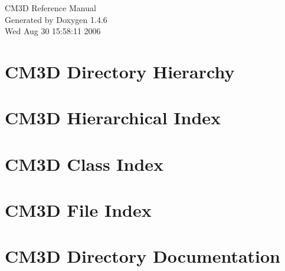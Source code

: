 \documentclass[a4paper]{book}
\begin{document}
\begin{titlepage}
\vspace*{7cm}
\begin{center}
{\Large CM3D Reference Manual}\\
\vspace*{1cm}
{\large Generated by Doxygen 1.4.6}\\
\vspace*{0.5cm}
{\small Wed Aug 30 15:58:11 2006}\\
\end{center}
\end{titlepage}
\clearemptydoublepage
{}
\tableofcontents
\clearemptydoublepage
{}
\chapter{CM3D Directory Hierarchy}

\chapter{CM3D Hierarchical Index}

\chapter{CM3D Class Index}

\chapter{CM3D File Index}

\chapter{CM3D Directory Documentation}























\end{document}
